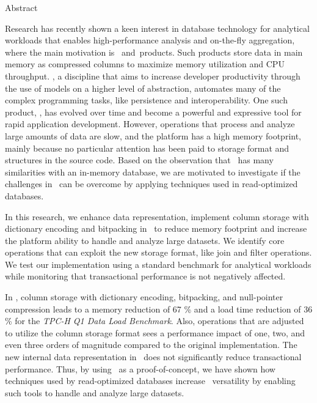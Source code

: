 {\Huge Abstract}
\vspace{1cm}

Research has recently shown a keen interest in database technology for analytical workloads that enables high-performance analysis and on-the-fly aggregation, where the main motivation is \bi~and\bd~products. Such products store data in main memory as compressed columns to maximize memory utilization and CPU throughput. \mde, a discipline that aims to increase developer productivity through the use of models on a higher level of abstraction, automates many of the complex programming tasks, like persistence and interoperability. One such product, \gap, has evolved over time and become a powerful and expressive tool for rapid application development. However, operations that process and analyze large amounts of data are slow, and the platform has a high memory footprint, mainly because no particular attention has been paid to storage format and structures in the source code. Based on the observation that \gap~has many similarities with an in-memory database, we are motivated to investigate if the challenges in \gap~can be overcome by applying techniques used in read-optimized databases. 

In this research, we enhance data representation, implement column storage with dictionary encoding and bitpacking in \gap~to reduce memory footprint and increase the platform ability to handle and analyze large datasets. We identify core operations that can exploit the new storage format, like join and filter operations. We test our implementation using a standard benchmark for analytical workloads while monitoring that transactional performance is not negatively affected. 

In \gap, column storage with dictionary encoding, bitpacking, and null-pointer compression leads to a memory reduction of 67 \% and a load time reduction of 36 \% for the \textit{TPC-H Q1 Data Load Benchmark}. Also, operations that are adjusted to utilize the column storage format sees a performance impact of one, two, and even three orders of magnitude compared to the original implementation. The new internal data representation in \gap~does not significantly reduce transactional performance. Thus, by using \gap~as a proof-of-concept, we have shown how techniques used by read-optimized databases increase \mde~versatility by enabling such tools to handle and analyze large datasets.


